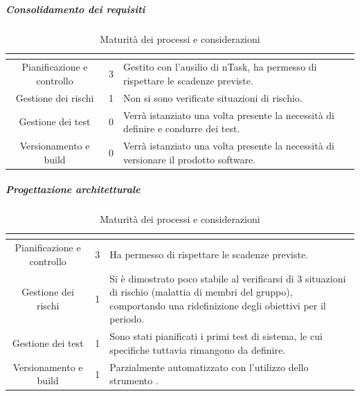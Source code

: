 \subparagraph{Consolidamento dei requisiti}\MiniSpazio
\renewcommand{\arraystretch}{1.5}
\begin{table}[H]
	\begin{center}
		\begin{tabular}{|c|c|p{6.8cm}|}
			\hline
			\rowcolor{title_row}
			\textbf{\color{title_text}{Processo}} & \textbf{\color{title_text}{Livello di maturità}} & \textbf{\color{title_text}{Considerazioni}} \\
			\hline
			{Pianificazione e controllo} & {3} & {Gestito con l'ausilio di nTask, ha permesso di rispettare le scadenze previste.}\\	
			\hline
			{Gestione dei rischi} & {1} & {Non si sono verificate situazioni di rischio.}\\	
			\hline
			{Gestione dei test} & {0} & {Verrà istanziato una volta presente la necessità di definire e condurre dei test.}\\	
			\hline
			{Versionamento e build} & {0} & {Verrà istanziato una volta presente la necessità di versionare il prodotto software.}\\	
			\hline
		\end{tabular}
		\caption[Maturità dei processi, Consolidamento]{Maturità dei processi e considerazioni}	
		\label{tabella: considerazioni sulla maturità dei processi raggiunta}
	\end{center}
\end{table}
\pagebreak
\subparagraph{Progettazione architetturale}\MiniSpazio
\renewcommand{\arraystretch}{1.5}
\begin{table}[H]
	\begin{center}
		\begin{tabular}{|c|c|p{6.8cm}|}
			\hline
			\rowcolor{title_row}
			\textbf{\color{title_text}{Processo}} & \textbf{\color{title_text}{Livello di maturità}} & \textbf{\color{title_text}{Considerazioni}} \\
			\hline
			{Pianificazione e controllo} & {3} & {Ha permesso di rispettare le scadenze previste.}\\	
			\hline
			{Gestione dei rischi} & {1} & {Si è dimostrato poco stabile al verificarsi di 3 situazioni di rischio (malattia di membri del gruppo), comportando una ridefinizione degli obiettivi per il periodo.}\\	
			\hline
			{Gestione dei test} & {1} & {Sono stati pianificati i primi test di sistema, le cui specifiche tuttavia rimangono da definire.}\\	
			\hline
			{Versionamento e build} & {1} & {Parzialmente automatizzato con l'utilizzo dello strumento \gl{Travis}.}\\	
			\hline
		\end{tabular}
		\caption[Maturità dei processi, Progettazione Architetturale]{Maturità dei processi e considerazioni}	
		\label{tabella: considerazioni sulla maturità dei processi raggiunta pa}
	\end{center}
\end{table}
\renewcommand{\arraystretch}{1}

